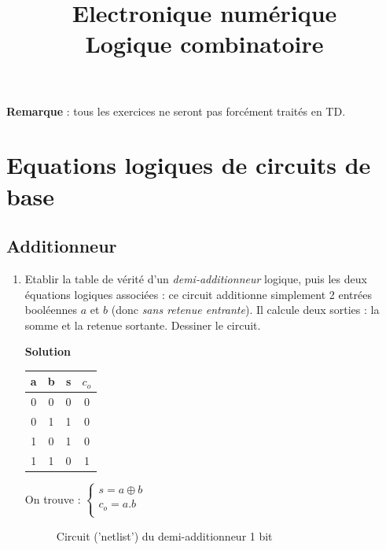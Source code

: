 \documentclass[a4paper,11pt]{article}
\title{{\Huge Electronique numérique}\\Logique combinatoire}
\date{}
\begin{document}
\maketitle
{\bf Remarque} : tous les exercices ne seront pas forcément traités en TD.

\section{Equations logiques de circuits de base}

\subsection{Additionneur}
\begin{enumerate}
\item Etablir la table de vérité d'un {\it demi-additionneur} logique, puis les deux équations logiques associées : ce circuit additionne simplement 2 entrées booléennes $a$ et $b$
(donc {\it sans retenue entrante}). Il calcule deux sorties : la somme et la retenue sortante. Dessiner le circuit.

\begin{cadre}
  {\bf Solution}\\

  \begin{tabular}{|c|c||c|c|}
    \hline
    a & b & s & $c_o$  \\
    \hline
    0 & 0 & 0 & 0 \\ \hline
    0 & 1 & 1 & 0 \\ \hline
    1 & 0 & 1 & 0 \\ \hline
    1 & 1 & 0 & 1  \\ \hline
  \end{tabular}
  On trouve :
  $
  \begin{cases}
    s = a \oplus b \\
    c_o = a.b \\
    \end{cases}
  $

\end{cadre}


\begin{figure}[!h]
  \centering
  \caption{Circuit ('netlist') du demi-additionneur 1 bit}
  \label{ha}
\end{figure}


\end{enumerate}
\end{document}
